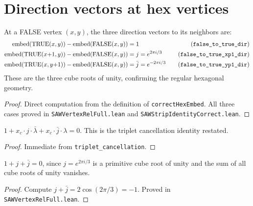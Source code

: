 \section{Direction vectors at hex vertices}\label{sec:dir_vectors}

\begin{lemma}\label{lem:false_directions}
\leanok
{}
  At a FALSE vertex $(x,y)$, the three direction vectors to its neighbors are:
  \begin{align*}
    \operatorname{embed}(\mathrm{TRUE}(x,y)) - \operatorname{embed}(\mathrm{FALSE}(x,y)) &= 1 & \quad\text{(\texttt{false\_to\_true\_dir})}\\
    \operatorname{embed}(\mathrm{TRUE}(x{+}1,y)) - \operatorname{embed}(\mathrm{FALSE}(x,y)) &= j = e^{2\pi i/3} & \quad\text{(\texttt{false\_to\_true\_xp1\_dir})}\\
    \operatorname{embed}(\mathrm{TRUE}(x,y{+}1)) - \operatorname{embed}(\mathrm{FALSE}(x,y)) &= \bar{j} = e^{-2\pi i/3} & \quad\text{(\texttt{false\_to\_true\_yp1\_dir})}
  \end{align*}
  These are the three cube roots of unity, confirming the regular hexagonal geometry.
\end{lemma}
\begin{proof}
\leanok
  Direct computation from the definition of \texttt{correctHexEmbed}.
  All three cases proved in \texttt{SAWVertexRelFull.lean} and \texttt{SAWStripIdentityCorrect.lean}.
\end{proof}

\begin{lemma}\label{lem:triplet_sum_zero}
\leanok
{}
  $1 + x_c \cdot j \cdot \bar{\lambda} + x_c \cdot \bar{j} \cdot \lambda = 0$.
  This is the triplet cancellation identity restated.
\end{lemma}
\begin{proof}
\leanok
  Immediate from \texttt{triplet\_cancellation}.
\end{proof}

\begin{lemma}\label{lem:cube_roots_sum}
\leanok
  $1 + j + \bar{j} = 0$, since $j = e^{2\pi i/3}$ is a primitive
  cube root of unity and the sum of all cube roots of unity vanishes.
\end{lemma}
\begin{proof}
\leanok
  Compute $j + \bar{j} = 2\cos(2\pi/3) = -1$.
  Proved in \texttt{SAWVertexRelFull.lean}.
\end{proof}

